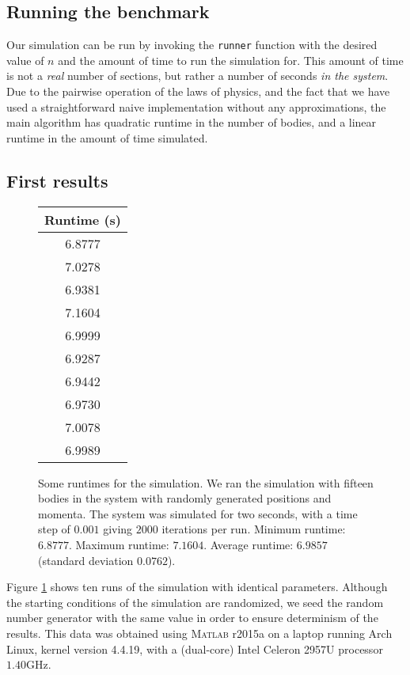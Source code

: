 \documentclass[11pt,letterpaper]{article}
\newcommand{\matlab}{\textsc{Matlab}}
\begin{document}
\subsection{Running the benchmark}

Our simulation can be run by invoking the \texttt{runner} function with the
desired value of $n$ and the amount of time to run the simulation for. This
amount of time is not a \emph{real} number of sections, but rather a number of
seconds \emph{in the system}. Due to the pairwise operation of the laws of
physics, and the fact that we have used a straightforward naive implementation
without any approximations, the main algorithm has quadratic runtime in the
number of bodies, and a linear runtime in the amount of time simulated.

\subsection{First results}

\begin{figure}[ht]
    \centering
    \begin{tabular}{|c|}
        \hline
        \textbf{Runtime (s)} \\ \hline \hline
        6.8777 \\
        7.0278 \\
        6.9381 \\
        7.1604 \\
        6.9999 \\
        6.9287 \\
        6.9442 \\
        6.9730 \\
        7.0078 \\
        6.9989 \\ \hline
    \end{tabular}

    \caption{
        Some runtimes for the simulation. We ran the simulation with fifteen
        bodies in the system with randomly generated positions and momenta. The
        system was simulated for two seconds, with a time step of $0.001$
        giving $2000$ iterations per run.
        Minimum runtime: $6.8777$.
        Maximum runtime: $7.1604$.
        Average runtime: $6.9857$ (standard deviation $0.0762$).
    }
    \label{data:unoptimized-run}
\end{figure}

Figure \ref{data:unoptimized-run} shows ten runs of the simulation with
identical parameters. Although the starting conditions of the simulation are
randomized, we seed the random number generator with the same value in order to
ensure determinism of the results. This data was obtained using \matlab{} r2015a
on a laptop running Arch Linux, kernel version 4.4.19, with a (dual-core) Intel
Celeron 2957U processor $1.40 \text{GHz}$.
\end{document}
